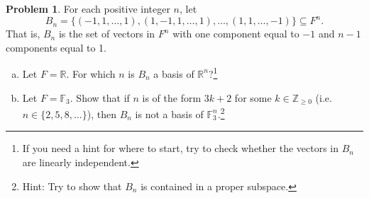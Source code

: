 \documentclass[11pt,oneside]{amsart}
\theoremstyle{definition}
\newtheorem{problem}{Problem}
\newcommand{\bF}{\mathbb{F}}
\newcommand{\bR}{\mathbb{R}}
\newcommand{\bZ}{\mathbb{Z}}
\begin{document}
    \newpage %

    \begin{problem}
        For each positive integer $n$, let \[B_n=\{(-1,1,\dots,1),(1,-1,1,\dots,1),\dots,(1,1,\dots,-1)\}\subseteq F^n.\] That is, $B_n$ is the set of vectors in $F^n$ with one component equal to $-1$ and $n-1$ components equal to 1. 
        \begin{enumerate}[(a)]
            \item Let $F=\bR$. For which $n$ is $B_n$ a basis of $\bR^n$?\footnote{If you need a hint for where to start, try to check whether the vectors in $B_n$ are linearly independent.}
            \item Let $F=\bF_3$. Show that if $n$ is of the form $3k+2$ for some $k\in\bZ_{\geq 0}$ (i.e.\ $n\in\{2,5,8,\dots\}$), then $B_n$ is not a basis of $\bF_3^n$.\footnote{Hint: Try to show that $B_n$ is contained in a proper subspace.}
        \end{enumerate}
    \end{problem}
\end{document}
